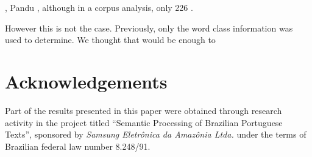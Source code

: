 , Pandu , although in a corpus analysis, only 226 \cite{Shulby2013}.

However this is not the case. Previously, only the word class information was used to determine. We thought that would be enough to 

\section{Acknowledgements}
Part of the results presented in this paper were obtained through research activity in the project titled 
``Semantic Processing of Brazilian Portuguese Texts'', sponsored by \emph{Samsung Eletr\^onica da Amaz\^onia Ltda.} under 
the terms of Brazilian federal law number 8.248/91.

